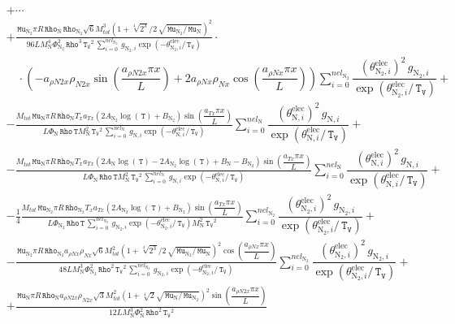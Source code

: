 \documentclass[10pt]{article}
\newcommand{\diff}[2] {\dfrac{\partial #1 }{\partial #2}}
\newcommand{\Rho}{\,\mathtt{Rho}}
\newcommand{\T}{\,\mathtt{T}}
\newcommand{\TV}{\,\mathtt{T_V}}
\newcommand{\N}{\text{N}}
\newcommand{\elec}{\text{elec}}
\newcommand{\Mu}{\, \mathtt{Mu}}
\newcommand{\mix}{\text{mix}\,}
\newcommand{\DKappaevDx}{\diff{\kappa^{ev}_{\mix}}{x}\,}
\newcommand{\eelecNden}{\,\sum_{i=0}^{nel_{\N}}   \, g_{\N,i}   \exp \left( -\theta^{\elec}_{\N,i} / \TV  \right) }
\newcommand{\eelecNdoisden}{\,\sum_{i=0}^{nel_{\N_2}}  \, g_{\N_2,i}   \exp \left( -\theta^{\elec}_{\N_2,i} /  \TV \right)}
\begin{document}
\begin{equation*}
\begin{split} %
&+\cdots\\
&+ \frac{\Mu_{\N_2} \pi R \Rho_{\N} \Rho_{\N_2} \sqrt{6} M_{tot}^{3} \left(1 + \sqrt[4]{2^3} / 2 \, \sqrt{ \Mu_{\N_2} / \Mu_{\N}
}\right)^{2} }{96 L M_{\N}^{4} \Phi_{\N_2}^{2} \Rho^{3} \TV^{2} \eelecNdoisden} \cdot\\
 &\quad \cdot\left(- a_{\rho N2 x} \rho_{N2 x} \sin\left(\dfrac{a_{\rho N2 x} \pi x}{L}\right) + 2 a_{\rho N x} \rho_{N x}
\cos\left(\dfrac{a_{\rho N x} \pi x}{L}\right)\right) \sum_{i=0}^{nel_{\N_2}} \dfrac{ \left( \theta^{\elec}_{\N_2,i} \right)^2  
\, g_{\N_2,i} }{ \exp \left( \theta^{\elec}_{\N_2,i} /  \TV \right)} +\\ 
%
&- \frac{M_{tot} \Mu_{\N} \pi R \Rho_{\N} T_{x} a_{Tx} ( 2 A_{\N_2} \log(\T)+B_{\N_2} ) \sin\left(\dfrac{a_{Tx} \pi
x}{L}\right)}{L \Phi_{\N} \Rho \T M_{\N}^{2} \TV^{2} \eelecNden} \sum_{i=0}^{nel_{\N}} \dfrac{ \left( \theta^{\elec}_{\N,i}
\right)^2   \, g_{\N,i} }{ \exp \left( \theta^{\elec}_{\N,i} / \TV \right)}+\\ 
%
&- \frac{M_{tot} \Mu_{\N} \pi R \Rho_{\N} T_{x} a_{Tx} ( 2 A_{\N} \log(\T) - 2 A_{\N_2} \log(\T) +B_{\N} - B_{\N_2} )
\sin\left(\dfrac{a_{Tx} \pi x}{L}\right)}{L \Phi_{\N} \Rho \T M_{\N}^{2} \TV^{2} \eelecNden} \sum_{i=0}^{nel_{\N}} \dfrac{ \left(
\theta^{\elec}_{\N,i} \right)^2   \, g_{\N,i} }{ \exp \left( \theta^{\elec}_{\N,i} / \TV \right)}+\\ 
%
%
&- \frac{1}{4}\frac{M_{tot} \Mu_{\N_2} \pi R \Rho_{\N_2} T_{x} a_{Tx} \left( 2 A_{\N_2} \log(\T) +B_{\N_2} \right)
\sin\left(\dfrac{a_{Tx} \pi x}{L}\right)}{L \Phi_{\N_2} \Rho \T \eelecNdoisden M_{\N}^{2} \TV^{2}}  \sum_{i=0}^{nel_{\N_2}}
\dfrac{ \left( \theta^{\elec}_{\N_2,i} \right)^2   \, g_{\N_2,i} }{ \exp \left( \theta^{\elec}_{\N_2,i} /  \TV \right)}+\\ 
%
&- \frac{\Mu_{\N_2} \pi R \Rho_{\N_2} a_{\rho N x} \rho_{N x} \sqrt{6} M_{tot}^{2} \left(1 + \sqrt[4]{2^3} / 2 \, \sqrt{
\Mu_{\N_2} / \Mu_{\N} }\right)^{2} \cos\left(\dfrac{a_{\rho N x} \pi x}{L}\right)}{48 L M_{\N}^{3} \Phi_{\N_2}^{2} \Rho^{2}
\TV^{2} \eelecNdoisden}  \sum_{i=0}^{nel_{\N_2}} \dfrac{ \left( \theta^{\elec}_{\N_2,i} \right)^2   \, g_{\N_2,i} }{ \exp \left(
\theta^{\elec}_{\N_2,i} /  \TV \right)}+\\ 
%
&+ \frac{\Mu_{\N} \pi R \Rho_{\N} a_{\rho N2 x} \rho_{N2 x} \sqrt{3} M_{tot}^{2} \left(1 + \sqrt[4]{2} \sqrt{ \Mu_{\N} /
\Mu_{\N_2} }\right)^{2} \sin\left(\dfrac{a_{\rho N2 x} \pi x}{L}\right)}{12 L M_{\N}^{3} \Phi_{\N}^{2} \Rho^{2} \TV^{2}
}
\end{split}
\end{equation*}
\end{document}
